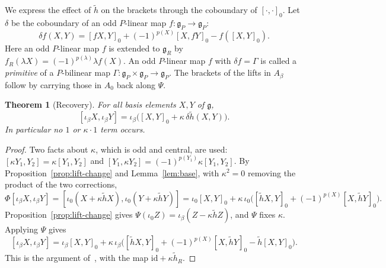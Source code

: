 \documentclass[11pt]{article}
\numberwithin{equation}{section}
\newtheorem{theorem}{Theorem}[section]
\theoremstyle{definition}
\theoremstyle{remark}
\begin{document}
We express the effect of $\tilde h$ on the brackets through the coboundary of $[\cdot,\cdot]_0$. Let $\delta$ be the coboundary of an odd $P$-linear map $f\colon\mathfrak g_P\to
\mathfrak g_P$:
\begin{equation}\label{eq:coboundary}
 \delta f(X,Y)=[fX,Y]_0+(-1)^{p(X)}[X,fY]_0-f([X,Y]_0).
\end{equation}
Here an odd $P$-linear map $f$ is extended to $\mathfrak g_R$ by $f_R(\lambda X)=(-1)^{p(\lambda)}\lambda f(X)$.
An odd $P$-linear map $f$ with $\delta f=\Gamma$ is called a \emph{primitive} of a $P$-bilinear map
$\Gamma\colon\mathfrak g_P\times\mathfrak g_P\to\mathfrak g_P$. The brackets of the lifts
in $A_\beta$ follow by carrying those in $A_0$ back along $\Psi$.

\begin{theorem}[Recovery]\label{thm:recovery}
For all basis elements $X,Y$ of $\mathfrak g$,
\[
 [\iota_\beta X,\iota_\beta Y]=\iota_\beta\bigl([X,Y]_0+\kappa\,\delta\tilde h(X,Y)\bigr).
\]
In particular no $1$ or $\kappa\cdot1$ term occurs.
\end{theorem}

\begin{proof}
Two facts about $\kappa$, which is odd and central, are used: $[\kappa Y_1,Y_2]=\kappa[Y_1,Y_2]$
and $[Y_1,\kappa Y_2]=(-1)^{p(Y_1)}\kappa[Y_1,Y_2]$. By Proposition~\ref{prop:lift-change} and
Lemma~\ref{lem:base}, with $\kappa^2=0$ removing the product of the two corrections,
\[
 \Phi[\iota_\beta X,\iota_\beta Y]=[\iota_0(X+\kappa\tilde hX),\iota_0(Y+\kappa\tilde hY)]
 =\iota_0[X,Y]_0+\kappa\,\iota_0\bigl([\tilde hX,Y]_0+(-1)^{p(X)}[X,\tilde hY]_0\bigr).
\]
Proposition~\ref{prop:lift-change} gives $\Psi(\iota_0Z)=\iota_\beta(Z-\kappa\tilde hZ)$,
and $\Psi$ fixes $\kappa$. Applying $\Psi$ gives
\[
 [\iota_\beta X,\iota_\beta Y]=\iota_\beta[X,Y]_0+\kappa\,\iota_\beta\bigl([\tilde hX,Y]_0
 +(-1)^{p(X)}[X,\tilde hY]_0-\tilde h[X,Y]_0\bigr).
\]
This is the argument of~\cite[Section~3]{Aoi26}, with the map $\mathrm{id}+\kappa\tilde h_R$.
\end{proof}
\end{document}
